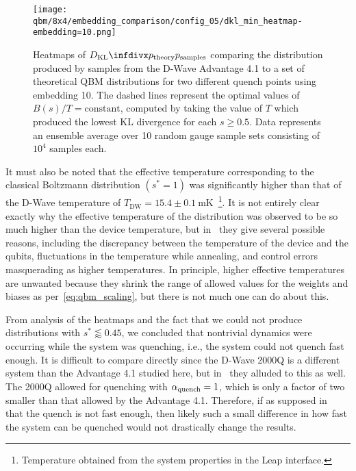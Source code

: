 \begin{figure}[!htb]
    \begin{center}
        \texttt{[image: qbm/8x4/embedding\_comparison/config\_05/dkl\_min\_heatmap-embedding=10.png]}
    \end{center}
    \caption{
        Heatmaps of \( \DKL{\ptheory}{\psamples} \) comparing the distribution produced by samples from the D-Wave Advantage 4.1 to a set of theoretical QBM distributions for two different quench points using embedding 10.
        The dashed lines represent the optimal values of \( B(s) / T = \text{constant} \), computed by taking the value of \( T \) which produced the lowest KL divergence for each \( s \ge 0.5 \).
        Data represents an ensemble average over 10 random gauge sample sets consisting of \( 10^4 \) samples each.
    }
    \label{fig:dkl_min_heatmap}
\end{figure}

It must also be noted that the effective temperature corresponding to the classical Boltzmann distribution \( (s^* = 1) \) was significantly higher than that of the D-Wave temperature of \( T_\text{DW} = 15.4 \pm 0.1 \ \si{\milli\kelvin} \)~\cite{dwave_leap}\footnote{Temperature obtained from the system properties in the Leap interface.}.
It is not entirely clear exactly why the effective temperature of the distribution was observed to be so much higher than the device temperature, but in~\cite{marshall_2019} they give several possible reasons, including the discrepancy between the temperature of the device and the qubits, fluctuations in the temperature while annealing, and control errors masquerading as higher temperatures.
In principle, higher effective temperatures are unwanted because they shrink the range of allowed values for the weights and biases as per~\cref{eq:qbm_scaling}, but there is not much one can do about this.

From analysis of the heatmaps and the fact that we could not produce distributions with \( s^* \lessapprox 0.45 \), we concluded that nontrivial dynamics were occurring while the system was quenching, i.e., the system could not quench fast enough.
It is difficult to compare directly since the D-Wave 2000Q is a different system than the Advantage 4.1 studied here, but in~\cite{marshall_2019} they alluded to this as well.
The 2000Q allowed for quenching with \( \alpha_{\text{quench}} = 1 \), which is only a factor of two smaller than that allowed by the Advantage 4.1.
Therefore, if as supposed in~\cite{marshall_2019} that the quench is not fast enough, then likely such a small difference in how fast the system can be quenched would not drastically change the results.

